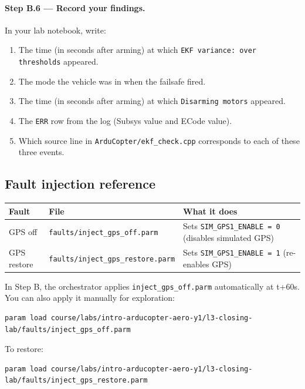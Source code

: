 \documentclass[a4paper,11pt,twoside]{article}
\begin{document}
\paragraph{Step B.6 --- Record your findings.}
In your lab notebook, write:
\begin{enumerate}
  \item The time (in seconds after arming) at which \texttt{EKF variance: over thresholds} appeared.
  \item The mode the vehicle was in when the failsafe fired.
  \item The time (in seconds after arming) at which \texttt{Disarming motors} appeared.
  \item The \texttt{ERR} row from the log (Subsys value and ECode value).
  \item Which source line in \texttt{ArduCopter/ekf\_check.cpp} corresponds to each of these three events.
\end{enumerate}

\subsection*{Fault injection reference}

\begin{center}\small
\begin{tabular}{|p{2.5cm}|p{4.5cm}|p{7.0cm}|}\hline
\textbf{Fault} & \textbf{File} & \textbf{What it does} \\ \hline
GPS off & \texttt{faults/inject\_gps\_off.parm} & Sets \texttt{SIM\_GPS1\_ENABLE = 0} (disables simulated GPS) \\ \hline
GPS restore & \texttt{faults/inject\_gps\_restore.parm} & Sets \texttt{SIM\_GPS1\_ENABLE = 1} (re-enables GPS) \\ \hline
\end{tabular}
\end{center}

In Step B, the orchestrator applies \texttt{inject\_gps\_off.parm} automatically at t+60s. You can also apply it manually for exploration:

\begin{Verbatim}[frame=single,fontsize=\small]
param load course/labs/intro-arducopter-aero-y1/l3-closing-lab/faults/inject_gps_off.parm
\end{Verbatim}

To restore:

\begin{Verbatim}[frame=single,fontsize=\small]
param load course/labs/intro-arducopter-aero-y1/l3-closing-lab/faults/inject_gps_restore.parm
\end{Verbatim}
\end{document}
